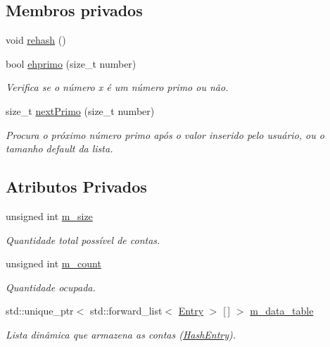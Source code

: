 \subsection*{Membros privados}
\begin{DoxyCompactItemize}
\item 
void \hyperlink{classHashTbl_a7cebfea55f49e14efd80cbcb2852171e}{rehash} ()
\item 
bool \hyperlink{classHashTbl_a71ce28f91782a9c92b1c87727668ba04}{ehprimo} (size\+\_\+t number)
\begin{DoxyCompactList}\small\item\em Verifica se o número x é um número primo ou não. \end{DoxyCompactList}\item 
size\+\_\+t \hyperlink{classHashTbl_aa85eb1e9ae9c838111b71a6ca464e9a5}{next\+Primo} (size\+\_\+t number)
\begin{DoxyCompactList}\small\item\em Procura o próximo número primo após o valor inserido pelo usuário, ou o tamanho default da lista. \end{DoxyCompactList}\end{DoxyCompactItemize}
\subsection*{Atributos Privados}
\begin{DoxyCompactItemize}
\item 
unsigned int \hyperlink{classHashTbl_acb5d99413eab0f528c43c01186ac7276}{m\+\_\+size}
\begin{DoxyCompactList}\small\item\em Quantidade total possível de contas. \end{DoxyCompactList}\item 
unsigned int \hyperlink{classHashTbl_a2ecc779b66589db1ed8167fe9b81a6c9}{m\+\_\+count}
\begin{DoxyCompactList}\small\item\em Quantidade ocupada. \end{DoxyCompactList}\item 
std\+::unique\+\_\+ptr$<$ std\+::forward\+\_\+list$<$ \hyperlink{classHashTbl_ab9ca4e5818aa21557c7cedaf02a1e7db}{Entry} $>$ \mbox{[}$\,$\mbox{]} $>$ \hyperlink{classHashTbl_af4bbcaeab668db62a8ca1d353377a4a4}{m\+\_\+data\+\_\+table}
\begin{DoxyCompactList}\small\item\em Lista dinâmica que armazena as contas (\hyperlink{classHashEntry}{Hash\+Entry}). \end{DoxyCompactList}\end{DoxyCompactItemize}
